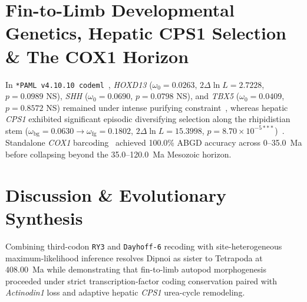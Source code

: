 \documentclass[10pt,letterpaper]{article}
\begin{document}
\section{Fin-to-Limb Developmental Genetics, Hepatic CPS1 Selection \& The COX1 Horizon}
In \texttt{*PAML v4.10.10 codeml}~\cite{yang2007paml4}, \emph{HOXD13} ($\omega_0 = 0.0263$, $2\Delta\ln L = 2.7228$, $p = 0.0989$ NS), \emph{SHH} ($\omega_0 = 0.0690$, $p = 0.0798$ NS), and \emph{TBX5} ($\omega_0 = 0.0409$, $p = 0.8572$ NS) remained under intense purifying constraint~\cite{zhang2010actinodin,nakamura2016digits,kvon2016zrs,lettice2003zrs}, whereas hepatic \emph{CPS1} exhibited significant episodic diversifying selection along the rhipidistian stem ($\omega_{\text{bg}} = 0.0630 \to \omega_{\text{fg}} = 0.1802$, $2\Delta\ln L = 15.3998$, $p = 8.70 \times 10^{-5***}$)~\cite{meyer2021lungfish,wang2021africanlungfish}. Standalone \emph{COX1} barcoding~\cite{hebert2003barcoding} achieved 100.0\% ABGD accuracy across 0--35.0~Ma before collapsing beyond the 35.0--120.0~Ma Mesozoic horizon.

\section{Discussion \& Evolutionary Synthesis}
Combining third-codon \texttt{RY3} and \texttt{Dayhoff-6} recoding with site-heterogeneous maximum-likelihood inference resolves Dipnoi as sister to Tetrapoda at 408.00~Ma while demonstrating that fin-to-limb autopod morphogenesis proceeded under strict transcription-factor coding conservation paired with \emph{Actinodin1} loss and adaptive hepatic \emph{CPS1} urea-cycle remodeling.
\end{document}
